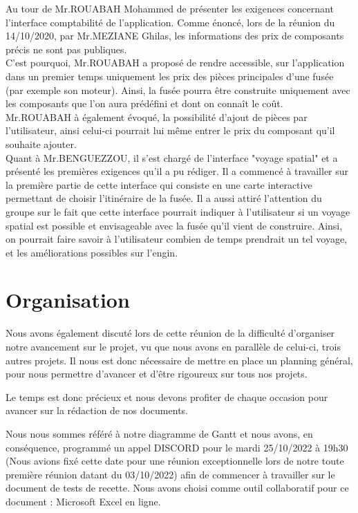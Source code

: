 \documentclass[a4paper, 12pt]{article}
\begin{document}
Au tour de Mr.ROUABAH Mohammed de présenter les exigences concernant l'interface comptabilité de l'application. Comme énoncé, lors de la réunion du 14/10/2020, par Mr.MEZIANE Ghilas, les informations des prix de composants précis ne sont pas publiques. \\ C'est pourquoi, Mr.ROUABAH a proposé de rendre accessible, sur l'application dans un premier temps uniquement les prix des pièces principales d'une fusée (par exemple son moteur). Ainsi, la fusée pourra être construite uniquement avec les composants que l'on aura prédéfini et dont on connaît le coût. \\ Mr.ROUABAH à également évoqué, la possibilité d'ajout de pièces par l'utilisateur, ainsi celui-ci pourrait lui même entrer le prix du composant qu'il souhaite ajouter.
 \\
 

Quant à Mr.BENGUEZZOU, il s'est chargé de l'interface "voyage spatial" et a présenté les premières exigences qu'il a pu rédiger. Il a commencé à travailler sur la première partie de cette interface qui consiste en une carte interactive permettant de choisir l'itinéraire de la fusée. Il a aussi attiré l'attention du groupe sur le fait que cette interface pourrait indiquer à l'utilisateur si un voyage spatial est possible et envisageable avec la fusée qu'il vient de construire. Ainsi, on pourrait faire savoir à l'utilisateur combien de temps prendrait un tel voyage, et les améliorations possibles sur l'engin.


\section{Organisation}
Nous avons également discuté lors de cette réunion de la difficulté d'organiser notre avancement sur le projet, vu que nous avons en parallèle de celui-ci, trois autres projets. Il nous est donc nécessaire de mettre en place un planning général, pour nous permettre d'avancer et d'être rigoureux sur tous nos projets.

Le temps est donc précieux et nous devons profiter de chaque occasion pour avancer sur la rédaction de nos documents.

Nous nous sommes référé à notre diagramme de Gantt et nous avons, en conséquence, programmé un appel DISCORD pour le mardi 25/10/2022 à 19h30 (Nous avions fixé cette date pour une réunion exceptionnelle lors de notre toute première réunion datant du 03/10/2022) afin de commencer à travailler sur le document de tests de recette. Nous avons choisi comme outil collaboratif pour ce document : Microsoft Excel en ligne. 
\end{document}

